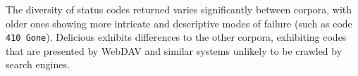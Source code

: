 
The diversity of status codes returned varies significantly between corpora, with older ones showing more intricate and descriptive modes of failure (such as code \texttt{410 Gone}).  Delicious exhibits differences to the other corpora, exhibiting codes that are presented by WebDAV and similar systems unlikely to be crawled by search engines.%









